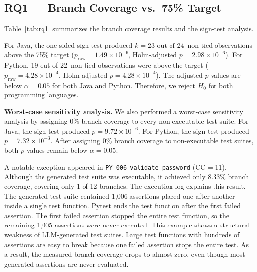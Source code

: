 \subsection{RQ1 --- Branch Coverage vs.\ 75\% Target}
\label{subsec:rq1}

Table~\ref{tab:rq1} summarizes the branch coverage results and the sign-test analysis.

\begin{table}[htbp]
\centering
\caption{RQ1: Branch Coverage Results (Primary Complete-Case Analysis)}
\label{tab:rq1}
\end{table}

For Java, the one-sided sign test produced $k = 23$ out of 24~non-tied observations above the 75\% target ($p_{\text{raw}} = 1.49 \times 10^{-6}$, Holm-adjusted $p = 2.98 \times 10^{-6}$).
For Python, 19 out of 22~non-tied observations were above the target ($p_{\text{raw}} = 4.28 \times 10^{-4}$, Holm-adjusted $p = 4.28 \times 10^{-4}$).
The adjusted $p$-values are below $\alpha = 0.05$ for both Java and Python. Therefore, we reject $H_0$ for both programming languages.

\textbf{Worst-case sensitivity analysis.}
We also performed a worst-case sensitivity analysis by assigning 0\% branch coverage to every non-executable test suite.
For Java, the sign test produced $p = 9.72 \times 10^{-6}$.
For Python, the sign test produced $p = 7.32 \times 10^{-3}$.
After assigning 0\% branch coverage to non-executable test suites, both $p$-values remain below $\alpha = 0.05$.

A notable exception appeared in \texttt{PY\_006\_validate\_password} (CC = 11).
Although the generated test suite was executable, it achieved only 8.33\% branch coverage, covering only 1 of 12 branches.
The execution log explains this result. The generated test suite contained 1,006 assertions placed one after another inside a single test function. Pytest ends the test function after the first failed assertion. The first failed assertion stopped the entire test function, so the remaining 1,005 assertions were never executed.
This example shows a structural weakness of LLM-generated test suites. Large test functions with hundreds of assertions are easy to break because one failed assertion stops the entire test. As a result, the measured branch coverage drops to almost zero, even though most generated assertions are never evaluated.

